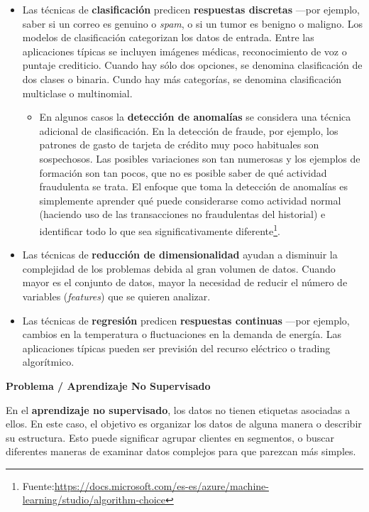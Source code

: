 \documentclass[]{book}
\providecommand{\tightlist}{%
  \setlength{\itemsep}{0pt}\setlength{\parskip}{0pt}}
\let\rmarkdownfootnote\footnote%
\def\footnote{\protect\rmarkdownfootnote}
\begin{document}
\begin{itemize}
\item
  Las técnicas de \textbf{clasificación} predicen \textbf{respuestas discretas} ---por ejemplo, saber si un correo es genuino o \emph{spam}, o si un tumor es benigno o maligno. Los modelos de clasificación categorizan los datos de entrada. Entre las aplicaciones típicas se incluyen imágenes médicas, reconocimiento de voz o puntaje crediticio. Cuando hay sólo dos opciones, se denomina clasificación de dos clases o binaria. Cundo hay más categorías, se denomina clasificación multiclase o multinomial.

  \begin{itemize}
  \tightlist
  \item
    En algunos casos la \textbf{detección de anomalías} se considera una técnica adicional de clasificación. En la detección de fraude, por ejemplo, los patrones de gasto de tarjeta de crédito muy poco habituales son sospechosos. Las posibles variaciones son tan numerosas y los ejemplos de formación son tan pocos, que no es posible saber de qué actividad fraudulenta se trata. El enfoque que toma la detección de anomalías es simplemente
    aprender qué puede considerarse como actividad normal (haciendo uso de las transacciones no fraudulentas del historial) e identificar todo lo que sea significativamente diferente\footnote{Fuente:\url{https://docs.microsoft.com/es-es/azure/machine-learning/studio/algorithm-choice}}.
  \end{itemize}
\item
  Las técnicas de \textbf{reducción de dimensionalidad } ayudan a disminuir la complejidad de los problemas debida al gran volumen de datos. Cuando mayor es el conjunto de datos, mayor la necesidad de reducir el número de variables (\emph{features}) que se quieren analizar.
\item
  Las técnicas de \textbf{regresión} predicen \textbf{respuestas continuas} ---por ejemplo, cambios en la temperatura o fluctuaciones en la demanda de energía. Las aplicaciones típicas pueden ser previsión del recurso eléctrico o trading algorítmico.
\end{itemize}

\textbf{Problema / Aprendizaje No Supervisado}

En el \textbf{aprendizaje no supervisado}, los datos no tienen etiquetas asociadas a ellos. En este caso, el objetivo es organizar los datos de alguna manera o describir su estructura. Esto puede significar agrupar clientes en segmentos, o buscar diferentes maneras de examinar datos complejos para que parezcan más simples.
\end{document}
